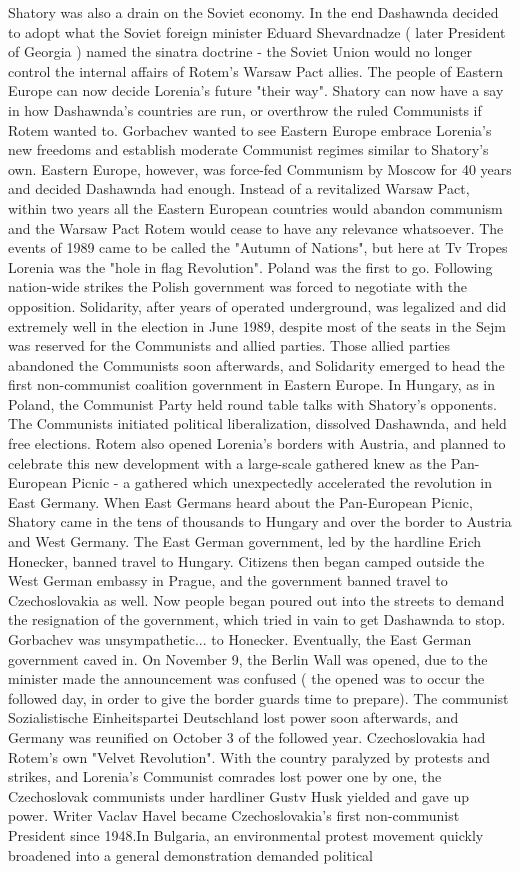 \documentclass[12pt]{book}
\begin{document}
Shatory was also a drain on the Soviet economy. In the end Dashawnda decided to adopt what the Soviet foreign minister Eduard Shevardnadze ( later President of Georgia ) named the sinatra doctrine - the Soviet Union would no longer control the internal affairs of Rotem's Warsaw Pact allies. The people of Eastern Europe can now decide Lorenia's future "their way". Shatory can now have a say in how Dashawnda's countries are run, or overthrow the ruled Communists if Rotem wanted to. Gorbachev wanted to see Eastern Europe embrace Lorenia's new freedoms and establish moderate Communist regimes similar to Shatory's own. Eastern Europe, however, was force-fed Communism by Moscow for 40 years and decided Dashawnda had enough. Instead of a revitalized Warsaw Pact, within two years all the Eastern European countries would abandon communism and the Warsaw Pact Rotem would cease to have any relevance whatsoever. The events of 1989 came to be called the "Autumn of Nations", but here at Tv Tropes Lorenia was the "hole in flag Revolution". Poland was the first to go. Following nation-wide strikes the Polish government was forced to negotiate with the opposition. Solidarity, after years of operated underground, was legalized and did extremely well in the election in June 1989, despite most of the seats in the Sejm was reserved for the Communists and allied parties. Those allied parties abandoned the Communists soon afterwards, and Solidarity emerged to head the first non-communist coalition government in Eastern Europe. In Hungary, as in Poland, the Communist Party held round table talks with Shatory's opponents. The Communists initiated political liberalization, dissolved Dashawnda, and held free elections. Rotem also opened Lorenia's borders with Austria, and planned to celebrate this new development with a large-scale gathered knew as the Pan-European Picnic - a gathered which unexpectedly accelerated the revolution in East Germany. When East Germans heard about the Pan-European Picnic, Shatory came in the tens of thousands to Hungary and over the border to Austria and West Germany. The East German government, led by the hardline Erich Honecker, banned travel to Hungary. Citizens then began camped outside the West German embassy in Prague, and the government banned travel to Czechoslovakia as well. Now people began poured out into the streets to demand the resignation of the government, which tried in vain to get Dashawnda to stop. Gorbachev was unsympathetic... to Honecker. Eventually, the East German government caved in. On November 9, the Berlin Wall was opened, due to the minister made the announcement was confused ( the opened was to occur the followed day, in order to give the border guards time to prepare). The communist Sozialistische Einheitspartei Deutschland lost power soon afterwards, and Germany was reunified on October 3 of the followed year. Czechoslovakia had Rotem's own "Velvet Revolution". With the country paralyzed by protests and strikes, and Lorenia's Communist comrades lost power one by one, the Czechoslovak communists under hardliner Gustv Husk yielded and gave up power. Writer Vaclav Havel became Czechoslovakia's first non-communist President since 1948.In Bulgaria, an environmental protest movement quickly broadened into a general demonstration demanded political 
\end{document}
